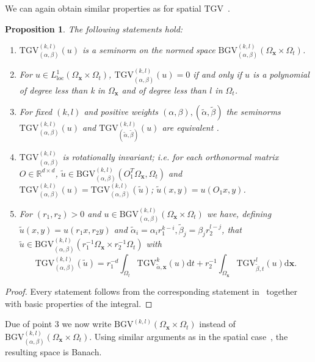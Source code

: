 \documentclass{article}
\newcommand{\dx}{\mathrm{d}}
\newcommand{\R}{\mathbb{R}}
\newcommand{\TGV}{\mathrm{TGV}}
\newcommand{\BGV}{\mathrm{BGV}}
\newcommand{\OmegaSpace}{\Omega_\mathbf{x}}
\newcommand{\OmegaTime}{\Omega_t}
\newtheorem{proposition}[theorem]{Proposition}
\begin{document}
	We can again obtain similar properties as for spatial $\TGV$~\cite[Proposition~3.3]{Br10}.
	\begin{proposition}
		\label{prop:TGVproperties2}
		The following statements hold:
		\begin{enumerate}[leftmargin=*]
			\item $\TGV_{(\alpha, \beta)}^{(k,l)}(u)$ is a seminorm on the normed space $\BGV_{(\alpha, \beta)}^{(k,l)}(\OmegaSpace \times\OmegaTime)$.
			\item For $u\in L^1_\text{loc}(\OmegaSpace \times \OmegaTime)$, $\TGV_{(\alpha, \beta)}^{(k,l)}(u) = 0$ if and only if $u$ is a polynomial of degree less than k in $\OmegaSpace$ and of degree less than $l$ in $\OmegaTime$.
			\item For fixed $(k,l)$ and positive weights $(\alpha, \beta), (\tilde{{\alpha}}, \tilde{\beta})$ the seminorms $\TGV_{(\alpha, \beta)}^{(k,l)}(u)$ and $\TGV_{(\tilde{\alpha}, \tilde{\beta})}^{(k,l)}(u)$ are equivalent .
			\item $\TGV_{(\alpha, \beta)}^{(k,l)}$ is rotationally invariant; i.e. for each orthonormal matrix $O \in \R^{d \times d}$,  $\tilde{u} \in \BGV_{(\alpha, \beta)}^{(k,l)}\left(O_1^T \OmegaSpace, \OmegaTime\right)$ and $\TGV_{(\alpha, \beta)}^{(k,l)}(u) = \TGV_{(\alpha, \beta)}^{(k,l)}(\tilde{u})$; $\tilde{u}(x, y) = u\left(O_1 x, y\right)$.
			\item For $(r_1, r_2) > 0$ and $u\in \BGV_{(\alpha, \beta)}^{(k,l)}(\OmegaSpace \times\OmegaTime)$ we have, defining $\tilde{u}(x, y) = u(r_1x, r_2y)$ and $\tilde{\alpha}_i = \alpha_i r_1^{k-i},\tilde{\beta}_j = \beta_j r_2^{l-j}$, that $\tilde{u} \in \BGV_{(\alpha, \beta)}^{(k,l)}(r_1^{-1}\OmegaSpace \times r_2^{-1}\OmegaTime)$ with 
			\begin{equation*}
				\TGV_{(\alpha, \beta)}^{(k,l)}(\tilde{u}) = r_1^{-d} \int_{\OmegaTime} \TGV_{\tilde{\alpha}, \mathbf{x}}^k(u) \dx t + r_2^{-1}\int_{\OmegaSpace} \TGV_{\tilde{\beta}, t}^l(u)\dx \mathbf{x}. 
			\end{equation*}
		\end{enumerate}
	\end{proposition}
	\begin{proof}
		Every statement follows from the corresponding statement in~\cite[Proposition 3.3]{Br10} together with basic properties of the integral.
	\end{proof}
	Due of point 3 we now write $\BGV^{(k,l)}(\OmegaSpace \times\OmegaTime)$ instead of $\BGV_{(\alpha, \beta)}^{(k,l)}(\OmegaSpace \times\OmegaTime)$.
	Using similar arguments as in the spatial case~\cite[Proposition~3.5]{Br10}, the resulting space is Banach.
\end{document}

